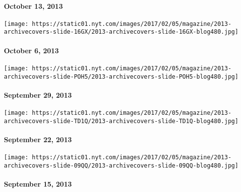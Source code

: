 \hypertarget{october-13-2013}{%
\paragraph{October 13, 2013}\label{october-13-2013}}

\href{http://www.nytimes.com/indexes/2013/10/06/magazine/index.html}{}

\texttt{[image: https://static01.nyt.com/images/2017/02/05/magazine/2013-archivecovers-slide-16GX/2013-archivecovers-slide-16GX-blog480.jpg]}

\hypertarget{october-6-2013}{%
\paragraph{October 6, 2013}\label{october-6-2013}}

\href{http://www.nytimes.com/indexes/2013/09/29/magazine/index.html}{}

\texttt{[image: https://static01.nyt.com/images/2017/02/05/magazine/2013-archivecovers-slide-POH5/2013-archivecovers-slide-POH5-blog480.jpg]}

\hypertarget{september-29-2013}{%
\paragraph{September 29, 2013}\label{september-29-2013}}

\href{http://www.nytimes.com/indexes/2013/09/22/magazine/index.html}{}

\texttt{[image: https://static01.nyt.com/images/2017/02/05/magazine/2013-archivecovers-slide-TD1Q/2013-archivecovers-slide-TD1Q-blog480.jpg]}

\hypertarget{september-22-2013}{%
\paragraph{September 22, 2013}\label{september-22-2013}}

\href{http://www.nytimes.com/indexes/2013/09/15/magazine/index.html}{}

\texttt{[image: https://static01.nyt.com/images/2017/02/05/magazine/2013-archivecovers-slide-09QQ/2013-archivecovers-slide-09QQ-blog480.jpg]}

\hypertarget{september-15-2013}{%
\paragraph{September 15, 2013}\label{september-15-2013}}

